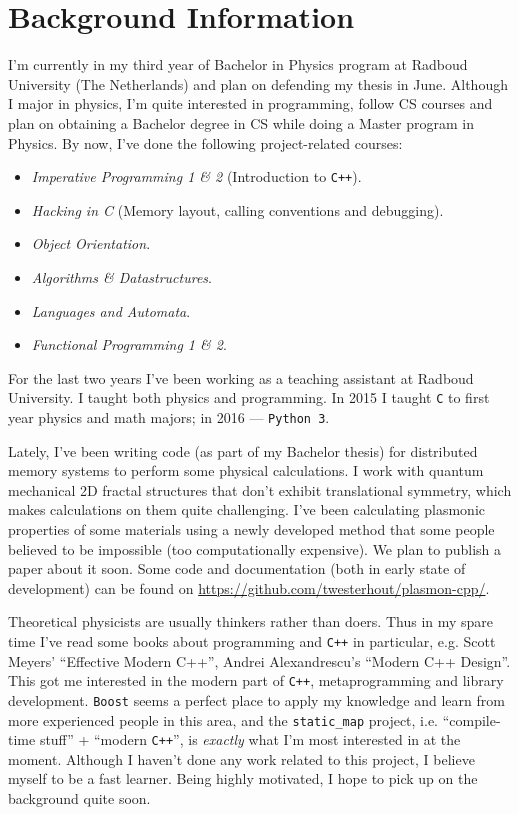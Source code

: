 \documentclass[a4paper,12pt]{article}
\begin{document}
\section{Background Information}
    I'm currently in my third year of Bachelor in Physics program at Radboud University (The Netherlands) and plan on defending my thesis in June. Although I major in physics, I'm quite interested in programming, follow CS courses and plan on obtaining a Bachelor degree in CS while doing a Master program in Physics. By now, I've done the following project-related courses:
    \begin{itemize}
    \item \textit{Imperative Programming 1 \& 2} (Introduction to \texttt{C++}).
    \item \textit{Hacking in C} (Memory layout, calling conventions and debugging). 
    \item \textit{Object Orientation}.
    \item \textit{Algorithms \& Datastructures}.
    \item \textit{Languages and Automata}.
    \item \textit{Functional Programming 1 \& 2}.
    \end{itemize}

    For the last two years I've been working as a teaching assistant at Radboud University. I taught both physics and programming. In 2015 I taught \texttt{C} to first year physics and math majors; in 2016 --- \texttt{Python 3}. 

    Lately, I've been writing code (as part of my Bachelor thesis) for distributed memory systems to perform some physical calculations. I work with quantum mechanical 2D fractal structures that don't exhibit translational symmetry, which makes calculations on them quite challenging. I've been calculating plasmonic properties of some materials using a newly developed method that some people believed to be impossible (too computationally expensive). We plan to publish a paper about it soon. Some code and documentation (both in early state of development) can be found on \url{https://github.com/twesterhout/plasmon-cpp/}.

    Theoretical physicists are usually thinkers rather than doers. Thus in my spare time I've read some books about programming and \texttt{C++} in particular, e.g. Scott Meyers' ``Effective Modern C++'', Andrei Alexandrescu's ``Modern C++ Design''. This got me interested in the modern part of \texttt{C++}, metaprogramming and library development. \texttt{Boost} seems a perfect place to apply my knowledge and learn from more experienced people in this area, and the \texttt{static\_map} project, i.e. ``compile-time stuff'' + ``modern \texttt{C++}'', is \textit{exactly} what I'm most interested in at the moment. Although I haven't done any work related to this project, I believe myself to be a fast learner. Being highly motivated, I hope to pick up on the background quite soon. 
    
\end{document}
